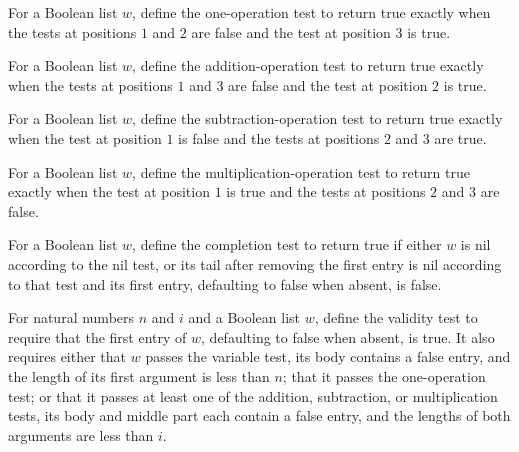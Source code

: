\begin{definition}
\label{Randomized.PIT.isOneW}
\leanok
{}
For a Boolean list $w$, define the one-operation test to return true exactly when the
tests at positions $1$ and $2$ are false and the test at position $3$ is true.
\end{definition}

\begin{definition}
\label{Randomized.PIT.isAddW}
\leanok
{}
For a Boolean list $w$, define the addition-operation test to return true exactly when
the tests at positions $1$ and $3$ are false and the test at position $2$ is true.
\end{definition}

\begin{definition}
\label{Randomized.PIT.isSubW}
\leanok
{}
For a Boolean list $w$, define the subtraction-operation test to return true exactly
when the test at position $1$ is false and the tests at positions $2$ and $3$ are true.
\end{definition}

\begin{definition}
\label{Randomized.PIT.isMulW}
\leanok
{}
For a Boolean list $w$, define the multiplication-operation test to return true exactly
when the test at position $1$ is true and the tests at positions $2$ and $3$ are false.
\end{definition}

\begin{definition}
\label{Randomized.PIT.isDone}
\leanok
{}
For a Boolean list $w$, define the completion test to return true if either $w$ is nil
according to the nil test, or its tail after removing the first entry is nil according
to that test and its first entry, defaulting to false when absent, is false.
\end{definition}

\begin{definition}
\label{Randomized.PIT.okW}
\leanok
{}
For natural numbers $n$ and $i$ and a Boolean list $w$, define the validity test to
require that the first entry of $w$, defaulting to false when absent, is true. It also
requires either that $w$ passes the variable test, its body contains a false entry, and
the length of its first argument is less than $n$; that it passes the one-operation
test; or that it passes at least one of the addition, subtraction, or multiplication
tests, its body and middle part each contain a false entry, and the lengths of both
arguments are less than $i$.
\end{definition}

